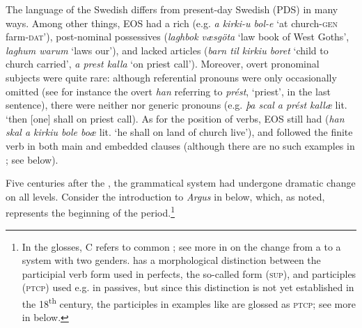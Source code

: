 \documentclass[output=paper]{langscibook}
\begin{document}
The language of the Swedish  differs from present-day Swedish (PDS) in many ways. Among other things, EOS had a rich  (e.g. \textit{a kirki-u bol-e} ‘at church-\textsc{gen} farm-\textsc{dat’}), post-nominal possessives (\textit{laghbok væsgöta} ‘law book of West Goths’, \textit{laghum warum} ‘laws our’), and lacked  articles (\textit{barn til kirkiu boret} ‘child to church carried’, \textit{a prest kalla} ‘on priest call’). Moreover, overt pronominal subjects were quite rare: although referential pronouns were only occasionally omitted (see for instance the overt \textit{han} referring to \textit{prést}, ‘priest’, in the last sentence), there were neither  nor generic pronouns (e.g. \textit{þa scal a prést kallæ} lit. ‘then [one] shall on priest call). As for the position of verbs, EOS still had  (\textit{han skal a kirkiu bole boæ} lit. ‘he shall on land of church live’), and  followed the finite verb in both main and embedded clauses (although there are no such examples in ; see  below).



Five centuries after the , the grammatical system had undergone dramatic change on all levels. Consider the introduction to \textit{Argus} in  below, which, as noted, represents the beginning of the  period.\footnote{In the glosses, \textsc{C} refers to common ; see more in  on the change from a  to a system with two genders.  has a morphological distinction between the participial verb form used in perfects, the so-called  form (\textsc{sup}), and  participles (\textsc{ptcp)} used e.g. in passives, but since this distinction is not yet established in the 18\textsuperscript{th} century, the participles in examples like  are glossed as \textsc{ptcp}; see more in  below.}
\end{document}
